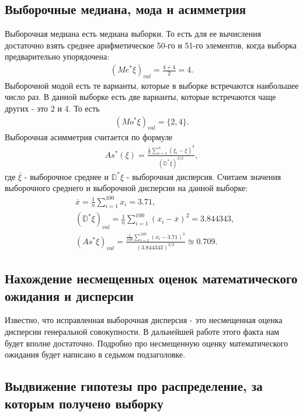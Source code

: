 \documentclass[14pt,a4paper]{scrartcl}
\theoremstyle{definition}
\theoremstyle{remark}
\theoremstyle{definition}
\theoremstyle{definition}
\begin{document}
\subsection{Выборочные медиана, мода и асимметрия}
Выборочная медиана есть медиана выборки. То есть для ее вычисления достаточно взять среднее арифметическое 50-го и 51-го элементов, когда выборка предварительно упорядочена:
\begin{align*}
  (Me^{*} \xi)_{val} = \frac{4 + 4}{2} = 4.
\end{align*}
Выборочной модой есть те варианты, которые в выборке встречаются наибольшее число раз. В данной выборке есть две варианты, которые встречаются чаще других - это 2 и 4. То есть
\begin{align*}
  (Mo^{*} \xi)_{val} = \{2, 4\}.
\end{align*}
Выборочная асимметрия считается по формуле
\begin{align*}
  As^{*}(\xi) = \frac{\frac{1}{n}\sum_{i = 1}^{n} (\xi_i - \overline{\xi})^{3}}{(\mathbb{D}^{*}\xi)^{3/2}},
\end{align*}
где $\overline{\xi}$ - выборочное среднее и $\mathbb{D}^{*}\xi$ - выборочная дисперсия.
Считаем значения выборочного среднего и выборочной дисперсии на данной выборке:
\begin{align*}
  &\overline{x} = \frac{1}{n} \sum_{i = 1}^{100} x_i = 3.71,\\
  &(\mathbb{D}^{*} \xi)_{val} = \frac{1}{n} \sum_{i = 1}^{100} (x_i - \overline{x})^2 = 3.844343, \\
  &(As^{*} \xi)_{val} = \frac{\frac{1}{100}\sum_{i = 1}^{100} (x_i - 3.71)^{3}}{(3.844343)^{3/2}} \approxeq 0.709.
\end{align*}

\subsection{Нахождение несмещенных оценок математического ожидания и дисперсии}

Известно, что исправленная выборочная дисперсия - это несмещенная оценка дисперсии генеральной совокупности. В дальнейшей работе этого факта нам будет вполне достаточно. Подробно про несмещенную оценку математического ожидания будет написано в седьмом подзаголовке.

\subsection{Выдвижение гипотезы про распределение, за которым получено выборку}
\end{document}
